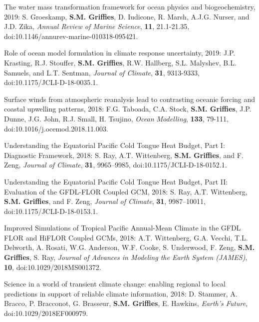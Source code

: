 \begin{etaremune}
\item The water mass transformation framework for ocean physics and biogeochemistry, 2019: S. Groeskamp, {\bf S.M. Grif\/f\/ies}, D. Iudicone,  R. Marsh, A.J.G. Nurser, and J.D. Zika, {\it Annual Review of Marine Science}, {\bf 11}, 21.1-21.35,
doi:10.1146/annurev-marine-010318-095421.

\item Role of ocean model formulation in climate response uncertainty, 2019: J.P. Krasting, R.J. Stouffer, {\bf S.M. Grif\/f\/ies}, R.W. Hallberg, S.L. Malyshev, B.L. Samuels, and L.T. Sentman, {\it Journal of Climate}, {\bf 31}, 9313-9333, doi:10.1175/JCLI-D-18-0035.1.

\item Surface winds from atmospheric reanalysis lead to contrasting oceanic forcing and coastal upwelling patterns, 2018: F.G. Taboada, C.A. Stock, {\bf S.M. Grif\/f\/ies}, J.P. Dunne, J.G. John, R.J. Small, H. Tsujino, {\it Ocean Modelling}, {\bf 133}, 79-111, 
doi:10.1016/j.ocemod.2018.11.003.

\item Understanding the Equatorial Pacific Cold Tongue Heat Budget, Part I: Diagnostic Framework, 2018: S. Ray, A.T. Wittenberg, {\bf S.M. Griffies}, and F. Zeng, {\it Journal of Climate}, {\bf 31}, 9965--9985, doi:10.1175/JCLI-D-18-0152.1. 

\item Understanding the Equatorial Pacific Cold Tongue Heat Budget, Part II: Evaluation of the GFDL-FLOR Coupled GCM, 2018: S. Ray, A.T. Wittenberg, {\bf S.M. Griffies}, and F. Zeng, {\it Journal of Climate}, {\bf 31}, 9987--10011, doi:10.1175/JCLI-D-18-0153.1.

\item Improved Simulations of Tropical Pacific Annual-Mean Climate in the GFDL FLOR and HiFLOR Coupled GCMs, 2018:  A.T. Wittenberg, G.A. Vecchi, T.L. Delworth, A. Rosati, W.G. Anderson, W.F. Cooke, S. Underwood, F. Zeng, {\bf S.M. Grif\/f\/ies}, S. Ray, {\it Journal of Advances in Modeling the Earth System (JAMES)}, {\bf 10}, doi:10.1029/2018MS001372. 


\item Science in a world of transient climate change: enabling regional to local predictions in support of reliable climate information, 2018: D. Stammer, A. Bracco, P. Bracconot, G. Brasseur, {\bf S.M. Grif\/f\/ies}, E. Hawkins, {\it Earth's Future}, \\ doi:10.1029/2018EF000979.


\end{etaremune}
